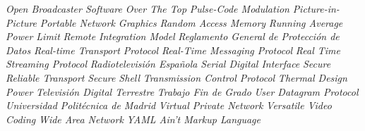 \begin{acronym}[SMPTE]
    {\textit{Open Broadcaster Software}}
    {\textit{Over The Top}}
    {\textit{Pulse-Code Modulation}}
    {\textit{Picture-in-Picture}}
    {\textit{Portable Network Graphics}}
    {\textit{Random Access Memory}}
   {\textit{Running Average Power Limit}}
   {\textit{Remote Integration Model}}
   {\textit{Reglamento General de Protección de Datos}}
    {\textit{Real-time Transport Protocol}}
   {\textit{Real-Time Messaging Protocol}}
   {\textit{Real Time Streaming Protocol}}
   {\textit{Radiotelevisión Española}}
    {\textit{Serial Digital Interface}}
    {\textit{Secure Reliable Transport}}
    {\textit{Secure Shell}}
    {\textit{Transmission Control Protocol}}
    {\textit{Thermal Design Power}}
    {\textit{Televisión Digital Terrestre}}
    {\textit{Trabajo Fin de Grado}}
    {\textit{User Datagram Protocol}}
    {\textit{Universidad Politécnica de Madrid}}
    {\textit{Virtual Private Network}}
    {\textit{Versatile Video Coding}}
    {\textit{Wide Area Network}}
   {\textit{YAML Ain't Markup Language}}
\end{acronym}

\newpage
